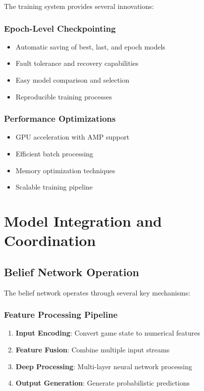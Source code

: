 \documentclass[conference]{IEEEtran}
\begin{document}
The training system provides several innovations:

\subsubsection{Epoch-Level Checkpointing}
\begin{itemize}
    \item Automatic saving of best, last, and epoch models
    \item Fault tolerance and recovery capabilities
    \item Easy model comparison and selection
    \item Reproducible training processes
\end{itemize}

\subsubsection{Performance Optimizations}
\begin{itemize}
    \item GPU acceleration with AMP support
    \item Efficient batch processing
    \item Memory optimization techniques
    \item Scalable training pipeline
\end{itemize}

\section{Model Integration and Coordination}

\subsection{Belief Network Operation}

The belief network operates through several key mechanisms:

\subsubsection{Feature Processing Pipeline}
\begin{enumerate}
    \item \textbf{Input Encoding}: Convert game state to numerical features
    \item \textbf{Feature Fusion}: Combine multiple input streams
    \item \textbf{Deep Processing}: Multi-layer neural network processing
    \item \textbf{Output Generation}: Generate probabilistic predictions
\end{enumerate}
\end{document}
